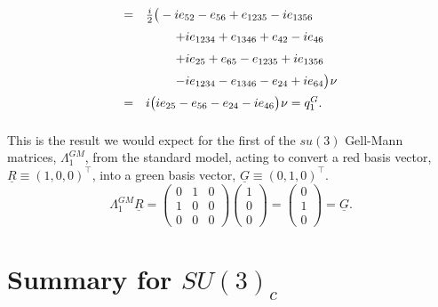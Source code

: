 \documentclass[letterpaper,12pt,titlepage,oneside,final]{book}
\newcommand{\spacer}{0.2cm}
\begin{document}
\begin{equation}
\begin{array}{ll}
=&\frac{i}{2}\big(-ie_{52}-e_{56}+e_{1235}-ie_{1356}\vspace{\spacer} \\
&\hspace{0.85cm}+ie_{1234}+e_{1346}+e_{42}-ie_{46}\vspace{\spacer} \\
&\hspace{0.85cm}+ie_{25}+e_{65}-e_{1235}+ie_{1356}\vspace{\spacer} \\
&\hspace{0.85cm}-ie_{1234}-e_{1346}-e_{24}+ie_{64}\big)\hspace{0.2mm}\nu\vspace{\spacer} \\
=&i\big(ie_{25}-e_{56}-e_{24}-ie_{46}\big)\hspace{0.2mm}\nu=q^G_{1}.\vspace{\spacer} \\
\end{array}\end{equation}


\noindent This is the result we would expect for the first of the $su(3)$ Gell-Mann matrices, $\Lambda^{GM}_1$, from the standard model, acting to convert a red basis vector, $\underline{R}\equiv (1,0,0)^\top$, into a green basis vector, $\underline{G}\equiv (0,1,0)^\top$.
\begin{equation} \Lambda^{GM}_1\underline{R} = \left(
\begin{array}{ccc}
0 & 1 & 0 \\
1 & 0 & 0 \\
0 & 0 & 0
\end{array} \right)\left(
\begin{array}{c}
1  \\
0  \\
0
\end{array} \right) = \left(
\begin{array}{c}
0  \\
1  \\
0
\end{array} \right) = \underline{G}.
\end{equation}




\section{Summary for $SU(3)_c$ }
\end{document}
